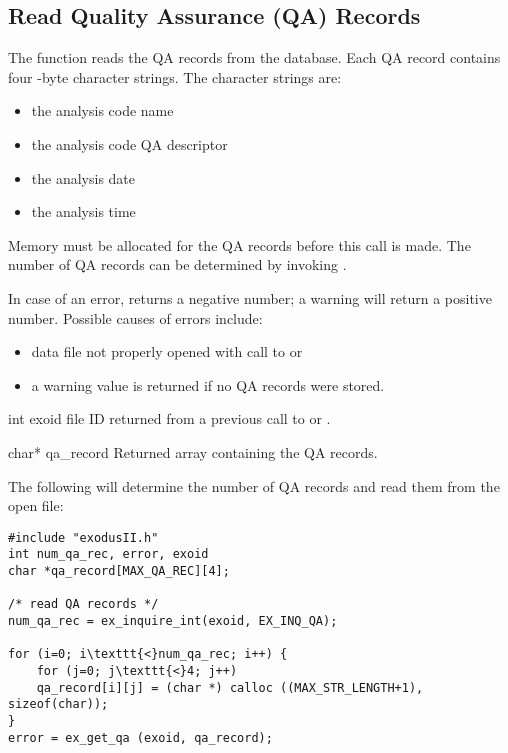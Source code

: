 \subsection{Read Quality Assurance (QA) Records}

The function  reads the QA records from the
database. Each QA record contains four -byte
character strings. The character strings are:

\begin{itemize}
\item the analysis code name
\item the analysis code QA descriptor
\item the analysis date
\item the analysis time
\end{itemize}

Memory must be allocated for the QA records before this call is
made. The number of QA records can be determined by invoking
.

In case of an error,  returns a negative number; a
warning will return a positive number.  Possible causes of errors
include:

\begin{itemize}
 \item data file not properly opened with call to  or

 \item a warning value is returned if no QA records were stored.
\end{itemize}


\begin{parameters}
\item[{int exoid \R{}}]
\exo{} file ID returned from a previous call to  
or .

\item[{char* qa_record \W{}}]
Returned array containing the QA records.
\end{parameters}


The following will determine the number of QA records and 
read them from the open \exo{} file:

\begin{lstlisting}
#include "exodusII.h"
int num_qa_rec, error, exoid
char *qa_record[MAX_QA_REC][4];

/* read QA records */
num_qa_rec = ex_inquire_int(exoid, EX_INQ_QA);

for (i=0; i\texttt{<}num_qa_rec; i++) {
    for (j=0; j\texttt{<}4; j++)
    qa_record[i][j] = (char *) calloc ((MAX_STR_LENGTH+1), sizeof(char));
}
error = ex_get_qa (exoid, qa_record);
\end{lstlisting}



